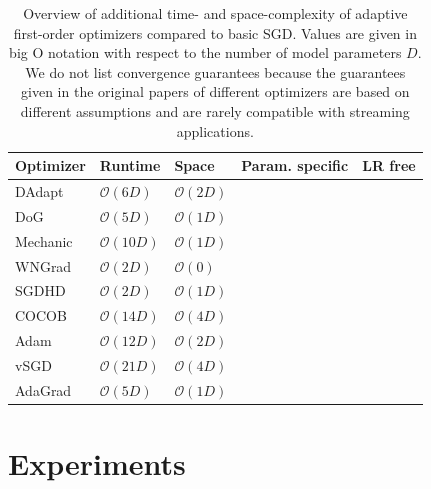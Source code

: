 \documentclass[letterpaper]{article} %
\newcommand{\cmark}{\ding{51}} %
\newcommand{\xmark}{\ding{55}} %
\begin{document}
\begin{table}[ht]
	\centering
	\small
	\begin{tabular}{@{}lllcc@{}}
		\toprule
		Optimizer & Runtime                         & Space             & Param. specific & LR free \\ \midrule
		DAdapt    & $\mathcal{O}(6D)$               & $\mathcal{O}(2D)$ & \xmark          & \cmark  \\
		DoG       & $\mathcal{O}(5D)$               & $\mathcal{O}(1D)$ & \xmark          & \cmark  \\
		Mechanic  & $\mathcal{O}(10D)$              & $\mathcal{O}(1D)$ & \xmark          & \cmark  \\
		WNGrad    & $\mathcal{O}(2D)$               & $\mathcal{O}(0)$  & \xmark          & \cmark  \\
		SGDHD     & $\mathcal{O}(2D)$               & $\mathcal{O}(1D)$ & \xmark          & \cmark  \\
		COCOB     & $\mathcal{O}(14D)$              & $\mathcal{O}(4D)$ & \cmark          & \cmark  \\
		Adam      & $\mathcal{O}(12D)$              & $\mathcal{O}(2D)$ & \cmark          & \xmark  \\
		vSGD      & $\mathcal{O}(21D)$\footnotemark & $\mathcal{O}(4D)$ & \cmark          & \cmark  \\
		AdaGrad   & $\mathcal{O}(5D)$               & $\mathcal{O}(1D)$ & \cmark          & \xmark  \\ \bottomrule
	\end{tabular}
	\caption{Overview of additional time- and space-complexity of adaptive first-order optimizers compared to basic SGD. Values are given in big O notation with respect to the number of model parameters $D$. We do not list convergence guarantees because the guarantees given in the original papers of different optimizers are based on different assumptions and are rarely compatible with streaming applications.}\label{tab:param_free_optims}
\end{table}


\section{Experiments}\label{sec:experiments}
\end{document}
